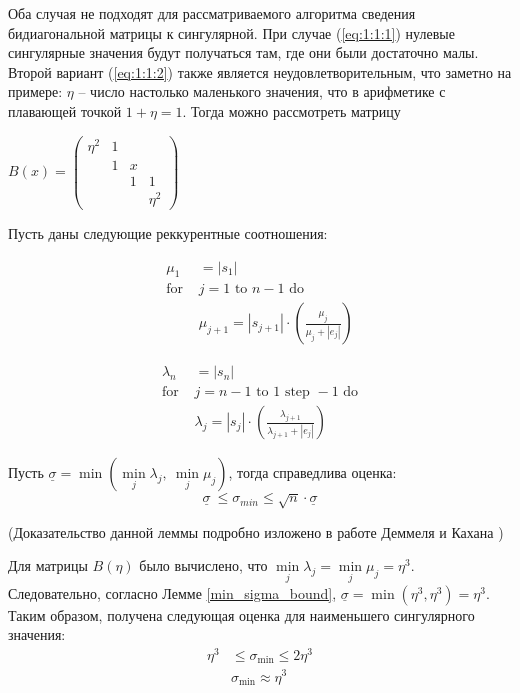 Оба случая не подходят для рассматриваемого алгоритма сведения бидиагональной матрицы к сингулярной. При случае (\ref{eq:1:1:1}) нулевые сингулярные значения будут получаться там, где они были достаточно малы. Второй вариант (\ref{eq:1:1:2})  также является неудовлетворительным, что заметно на примере: $\eta$ -- число настолько маленького значения, что в арифметике с плавающей точкой $1+\eta=1$. Тогда можно рассмотреть матрицу
\begin{center}
$B(x)=\begin{pmatrix}
    \eta^2&1&&\\
    &1&x\\
    &&1&1\\
    &&&\eta^2
\end{pmatrix}$
\end{center}

\begin{lemma} \label{min_sigma_bound}
Пусть даны следующие реккурентные соотношения: \\
\begin{minipage}{0.48\textwidth}
\begin{align*}
\mu_1& = |s_1| \\
\text{for }& j = 1 \text{ to } n-1 \text{ do} \\
&\mu_{j+1} = |s_{j+1}| \cdot \left( \frac{\mu_j}{\mu_j + |e_j|} \right)
\end{align*}
\end{minipage}
\hfill
\begin{minipage}{0.48\textwidth}
\begin{align*}
\lambda_n& = |s_n| \\
\text{for }& j = n-1 \text{ to } 1 \text{ step } -1 \text{ do} \\
&\lambda_j = |s_j| \cdot \left( \frac{\lambda_{j+1}}{\lambda_{j+1} + |e_j|} \right)
\end{align*}
\end{minipage}
\vspace{1em}

Пусть $\underline{\sigma} = \min(\min\limits_j \lambda_j, \ \min\limits_j \mu_j)$, тогда справедлива оценка:
\begin{equation}
\underline{\sigma}\ \leq \sigma_{min}\leq \sqrt{n}\cdot\underline{\sigma}
\end{equation}
\end{lemma}
(Доказательство данной леммы подробно изложено в работе Деммеля и Кахана \cite[стр. 5-6]{Demmel1990})


Для матрицы $B(\eta)$ было вычислено, что $\min\limits_j \lambda_j = \min\limits_j \mu_j = \eta^3$. Следовательно, согласно Лемме \ref{min_sigma_bound}, $\underline{\sigma} = \min(\eta^3, \eta^3) = \eta^3$. Таким образом, получена следующая оценка для наименьшего сингулярного значения:
\begin{align*}
\eta^3 &\leq \sigma_{\min} \leq 2\eta^3 \\
&\sigma_{\min} \approx \eta^3
\end{align*}

